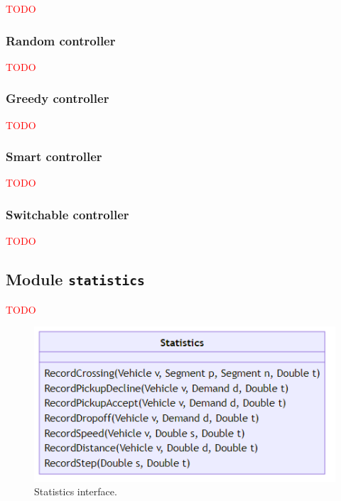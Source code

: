 \documentclass[10pt,twocolumn]{article}
\begin{document}
\textcolor{red}{TODO}

\subsubsection{Random controller}
\label{sec:controller-random}

\textcolor{red}{TODO}

\subsubsection{Greedy controller}
\label{sec:controller-greedy}

\textcolor{red}{TODO}

\subsubsection{Smart controller}
\label{sec:controller-smart}

\textcolor{red}{TODO}

\subsubsection{Switchable controller}
\label{sec:controller-switch}

\textcolor{red}{TODO}

\subsection{Module \texttt{statistics}}
\label{sec:statistics-interface}

\textcolor{red}{TODO}

\begin{figure}[h!]
    \centering
    \includegraphics[scale=0.4]{../../diagrams/statistics/classes.png}
    \caption{Statistics interface.}
    \label{fig:statistics-interface}
\end{figure}
\end{document}
